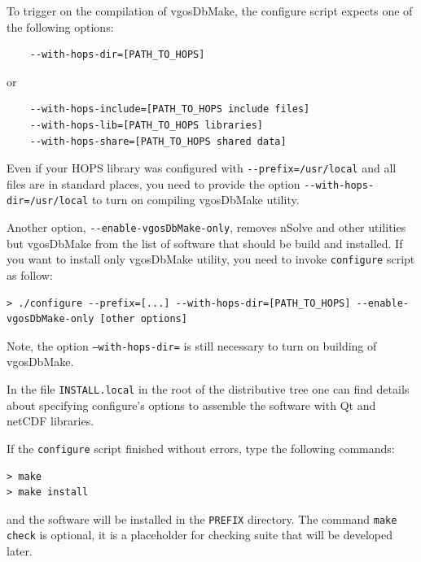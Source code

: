 \documentclass [10pt,letterpaper]{report}
\newcommand{\nuSolve}{\greektext n\latintext Solve}
\begin{document}
To trigger on the compilation of vgosDbMake, the configure script expects one
of the following options:
\begin{verbatim}
    --with-hops-dir=[PATH_TO_HOPS]
\end{verbatim}
or
\begin{verbatim}
    --with-hops-include=[PATH_TO_HOPS include files]
    --with-hops-lib=[PATH_TO_HOPS libraries]
    --with-hops-share=[PATH_TO_HOPS shared data]
\end{verbatim}
Even if your HOPS library was configured with {\tt -{}-prefix=/usr/local} and all
files are in standard places, you need to provide the option {\tt -{}-with-hops-dir=/usr/local}
to turn on compiling vgosDbMake utility.

Another option, {\tt -{}-enable-vgosDbMake-only}, removes \nuSolve{} and other
utilities but vgosDbMake from the list of software that should be build and
installed. If you want to install only vgosDbMake utility, you need to
invoke {\tt configure} script as follow:
\begin{verbatim}
> ./configure --prefix=[...] --with-hops-dir=[PATH_TO_HOPS] --enable-vgosDbMake-only [other options]
\end{verbatim}
Note, the option {\tt --with-hops-dir=} is still necessary to turn on building
of vgosDbMake.


In the file {\tt INSTALL.local} in the root of the distributive tree one can
find details about specifying configure's options to assemble the software
with Qt and netCDF libraries.

If the {\tt configure} script finished without errors, type the
following commands:
\begin{verbatim}
> make
> make install
\end{verbatim}
\noindent
and the software will be installed in the {\tt PREFIX} directory. The
command {\tt make check} is optional, it is a placeholder for checking
suite that will be developed later.





%
%
\end{document}

